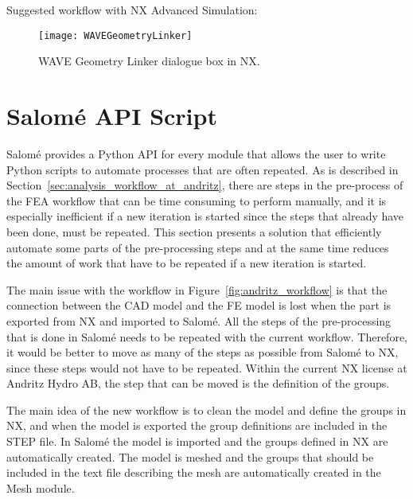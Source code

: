 Suggested workflow with NX Advanced Simulation:

\begin{figure}[t]
	\begin{center}
		\texttt{[image: WAVEGeometryLinker]}
	\end{center}
	\caption{WAVE Geometry Linker dialogue box in NX.}
	\label{fig:WAVEGeometryLinker}
\end{figure}

\section{Salomé API Script} %
\label{sec:salom_api_script}
Salomé provides a Python API for every module that allows the user to write Python scripts to automate processes that are often repeated. As is described in Section~\ref{sec:analysis_workflow_at_andritz}, there are steps in the pre-process of the FEA workflow that can be time consuming to perform manually, and it is especially inefficient if a new iteration is started since the steps that already have been done, must be repeated. This section presents a solution that efficiently automate some parts of the pre-processing steps and at the same time reduces the amount of work that have to be repeated if a new iteration is started.

The main issue with the workflow in Figure~\ref{fig:andritz_workflow} is that the connection between the CAD model and the FE model is lost when the part is exported from NX and imported to Salomé. All the steps of the pre-processing that is done in Salomé needs to be repeated with the current workflow. Therefore, it would be better to move as many of the steps as possible from Salomé to NX, since these steps would not have to be repeated. Within the current NX license at Andritz Hydro AB, the step that can be moved is the definition of the groups.

The main idea of the new workflow is to clean the model and define the groups in NX, and when the model is exported the group definitions are included in the STEP file. In Salomé the model is imported and the groups defined in NX are automatically created. The model is meshed and the groups that should be included in the text file describing the mesh are automatically created in the Mesh module.

